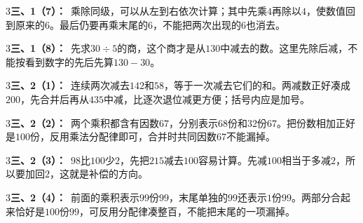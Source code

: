 \documentclass[multi=snippet,border={5bp 20bp 5bp 5bp}]{standalone}
\newenvironment{snippet}[3]{\begin{minipage}{#1bp}\color{answerred}\fontsize{#2}{#3}\selectfont\raggedright}{\end{minipage}}
\begin{document}
\begin{snippet}{505}{11.5}{14}\begin{multicols}{3}\raggedcolumns \textbf{三、1（7）：}\ 乘除同级，可以从左到右依次计算；其中先乘\(4\)\allowbreak 再除以\(4\)\allowbreak ，使数值回到原来的\(6\)\allowbreak 。最后仍要再乘末尾的\(6\)\allowbreak ，不能把两次出现的\(6\)\allowbreak 也消去。\end{multicols}\end{snippet}
\begin{snippet}{505}{11.5}{14}\begin{multicols}{3}\raggedcolumns \textbf{三、1（8）：}\ 先求\(30\div5\)\allowbreak 的商，这个商才是从\(130\)\allowbreak 中减去的数。这里先除后减，不能按看到数字的先后先算\(130-30\)\allowbreak 。\end{multicols}\end{snippet}
\begin{snippet}{505}{11.5}{14}\begin{multicols}{3}\raggedcolumns \textbf{三、2（1）：}\ 连续两次减去\(142\)\allowbreak 和\(58\)\allowbreak ，等于一次减去它们的和。两减数正好凑成\(200\)\allowbreak ，先合并后再从\(435\)\allowbreak 中减，比逐次退位减更方便；括号内应是加号。\end{multicols}\end{snippet}
\begin{snippet}{505}{11.5}{14}\begin{multicols}{3}\raggedcolumns \textbf{三、2（2）：}\ 两个乘积都含有因数\(67\)\allowbreak ，分别表示\(68\)\allowbreak 份和\(32\)\allowbreak 份\(67\)\allowbreak 。把份数相加正好是\(100\)\allowbreak 份，反用乘法分配律即可，合并时共同因数\(67\)\allowbreak 不能漏掉。\end{multicols}\end{snippet}
\begin{snippet}{505}{11.5}{14}\begin{multicols}{3}\raggedcolumns \textbf{三、2（3）：}\ \(98\)\allowbreak 比\(100\)\allowbreak 少\(2\)\allowbreak ，先把\(215\)\allowbreak 减去\(100\)\allowbreak 容易计算。先减\(100\)\allowbreak 相当于多减\(2\)\allowbreak ，所以要加回\(2\)\allowbreak ，这就是补偿的方向。\end{multicols}\end{snippet}
\begin{snippet}{505}{11.5}{14}\begin{multicols}{3}\raggedcolumns \textbf{三、2（4）：}\ 前面的乘积表示\(99\)\allowbreak 份\(99\)\allowbreak ，末尾单独的\(99\)\allowbreak 还表示\(1\)\allowbreak 份\(99\)\allowbreak 。两部分合起来恰好是\(100\)\allowbreak 份\(99\)\allowbreak ，可反用分配律凑整百，不能把末尾的一项漏掉。\end{multicols}\end{snippet}
\end{document}
